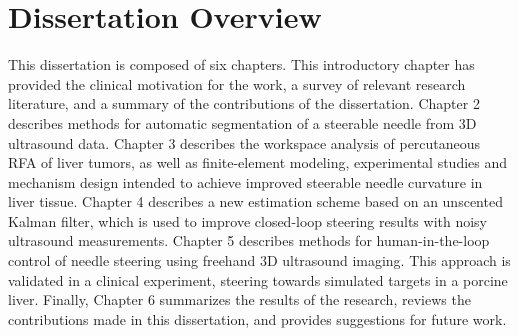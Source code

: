 \section{Dissertation Overview}
This dissertation is composed of six chapters. This introductory chapter has provided the clinical motivation for the work, a survey of relevant research literature, and a summary of the contributions of the dissertation. Chapter 2 describes methods for automatic segmentation of a steerable needle from 3D ultrasound data. Chapter 3 describes the workspace analysis of percutaneous RFA of liver tumors, as well as finite-element modeling, experimental studies and mechanism design intended to achieve improved steerable needle curvature in liver tissue. Chapter 4 describes a new estimation scheme based on an unscented Kalman filter, which is used to improve closed-loop steering results with noisy ultrasound measurements. Chapter 5 describes methods for human-in-the-loop control of needle steering using freehand 3D ultrasound imaging. This approach is validated in a clinical experiment, steering towards simulated targets in a porcine liver. Finally, Chapter 6 summarizes the results of the research, reviews the contributions made in this dissertation, and provides suggestions for future work.